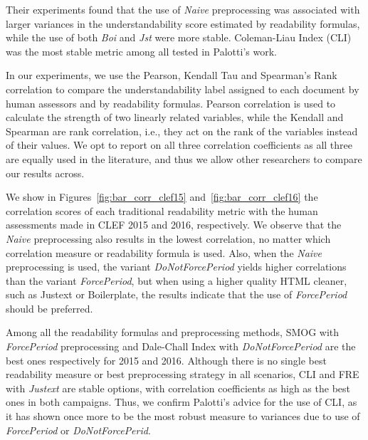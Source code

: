 Their experiments found that the use of \textit{Naive} preprocessing was associated with larger variances in the understandability score estimated by readability formulas, while the use of both \textit{Boi} and \textit{Jst} were more stable. Coleman-Liau Index (CLI) was the most stable metric among all tested in Palotti's work\cite{palotti15}.

In our experiments, we use the Pearson, Kendall Tau and Spearman's Rank correlation to compare the understandability label assigned to each document by human assessors and by readability formulas.
Pearson correlation is used to calculate the strength of two linearly related variables, while the Kendall and Spearman are rank correlation, i.e., they act on the rank of the variables instead of their values. We opt to report on all three correlation coefficients as all three are equally used in the literature, and thus we allow other researchers to compare our results across.

We show in Figures~\ref{fig:bar_corr_clef15} and~\ref{fig:bar_corr_clef16} the correlation scores of each traditional readability metric with the human assessments made in CLEF 2015 and 2016, respectively. We observe that the \textit{Naive} preprocessing also results in the lowest
correlation, no matter which correlation measure or readability formula is used. Also, when the \textit{Naive} preprocessing is used, the variant \textit{DoNotForcePeriod} yields higher correlations than the variant \textit{ForcePeriod}, but when using a higher quality HTML cleaner, such as Justext or Boilerplate, the results indicate that the use of \textit{ForcePeriod} should be preferred.

Among all the readability formulas and preprocessing methods, SMOG with \textit{ForcePeriod} preprocessing and Dale-Chall Index with \textit{DoNotForcePeriod} are the best ones respectively for 2015 and 2016. Although there is no single best readability measure or best preprocessing strategy in all scenarios, CLI and FRE with \textit{Justext} are stable options, with correlation coefficients as high as the best ones in both campaigns. Thus, we confirm Palotti's advice for the use of CLI, as it
has shown once more to be the most robust measure to variances due to use of \textit{ForcePeriod} or \textit{DoNotForcePerid}.



